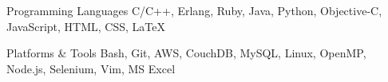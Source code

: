 

\begin{cvskills}

  \cvskill
    {Programming Languages} %
    {C/C++, Erlang, Ruby, Java, Python, Objective-C, JavaScript, HTML, CSS, LaTeX} %

  \cvskill
  {Platforms \& Tools} %
    {Bash, Git, AWS, CouchDB, MySQL, Linux, OpenMP, Node.js, Selenium, Vim, MS Excel} %

\end{cvskills}
